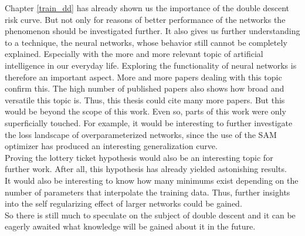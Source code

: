 Chapter \ref{train_dd} has already shown us the importance of the double descent risk curve. But not only for reasons of better performance of the networks the phenomenon should be investigated further. It also gives us further understanding to a technique, the neural networks, whose behavior still cannot be completely explained. Especially with the more and more relevant topic of artificial intelligence in our everyday life. Exploring the functionality of neural networks is therefore an important aspect.
More and more papers dealing with this topic confirm this. The high number of published papers also shows how broad and versatile this topic is. Thus, this thesis could cite many more papers. But this would be beyond the scope of this work.  Even so, parts of this work were only superficially touched. For example, it would be interesting to further investigate the loss landscape of overparameterized networks, since the use of the SAM optimizer has produced an interesting generalization curve. \\
Proving the lottery ticket hypothesis would also be an interesting topic for further work. After all, this hypothesis has already yielded astonishing results. \\
It would also be interesting to know how many minimums exist depending on the number of parameters that interpolate the training data. Thus, further insights into the self regularizing effect of larger networks could be gained. \\
So there is still much to speculate on the subject of double descent and it can be eagerly awaited what knowledge will be gained about it in the future.








